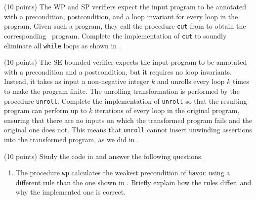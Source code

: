 \documentclass{handout}
\begin{document}
\begin{questions}

\item (10 points) \label{prob:ivl-inv} The WP and SP verifiers expect the input
program to be annotated with a precondition, postcondition, and a loop invariant
for every loop in the program. Given such a program, they call the procedure
\lstinline{cut} from  to obtain the corresponding \ivl\
program. Complete the implementation of \lstinline{cut} to soundly eliminate all
\lstinline{while} loops as shown in \lecture{12}.



\item (10 points) \label{prob:ivl-unroll} The SE bounded verifier expects the
input program to be annotated with a precondition and a postcondition, but it
requires no loop invariants.  Instead, it takes as input a non-negative integer
$k$ and unrolls every loop $k$ times to make the program finite. The unrolling
transformation is performed by the procedure \lstinline{unroll}. Complete the
implementation of \lstinline{unroll}  so that the resulting \ivl program can
perform up to $k$ iterations of every loop in the original \imp program,
ensuring that  there are no inputs on which the transformed program fails and
the original one does not. This means that \lstinline{unroll} cannot insert
unwinding assertions into the transformed program, as we did in \lecture{5}.



\item (10 points) \label{prob:ver-study} Study the code in 
and answer the following questions.

\begin{enumerate}
\item The procedure \lstinline{wp} calculates the weakest precondition of
 \lstinline{havoc} using a different rule than the one shown in .
 Briefly explain how the rules differ, and why the implemented one is
 correct.\looseness=-1




\end{enumerate}
\end{questions}
\end{document}

